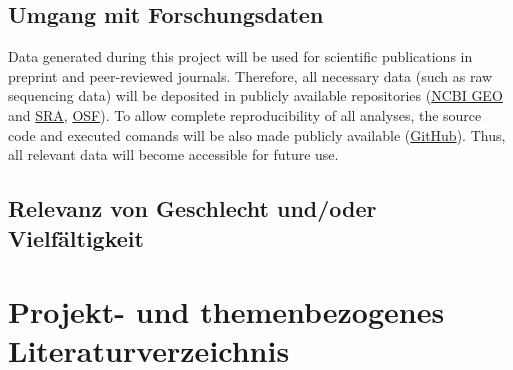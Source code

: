 \documentclass[ngerman]{scrartcl}
\begin{document}
\subsection{Umgang mit Forschungsdaten}
Data generated during this project will be used for scientific publications in
preprint and peer-reviewed journals. Therefore, all necessary data (such as raw
sequencing data) will be deposited in publicly available repositories
(\href{https://www.ncbi.nlm.nih.gov/geo/}{NCBI GEO} and
\href{https://www.ncbi.nlm.nih.gov/sra}{SRA}, \href{https://osf.io/}{OSF}). To
allow complete reproducibility of all analyses, the source code and executed
comands will be also made publicly available
(\href{https://github.com/}{GitHub}).  Thus, all relevant data will become
accessible for future use. 

\subsection{Relevanz von Geschlecht und/oder Vielfältigkeit}

\section{Projekt- und themenbezogenes Literaturverzeichnis}
\label{sec:bib}




\backmatter
\end{document}
